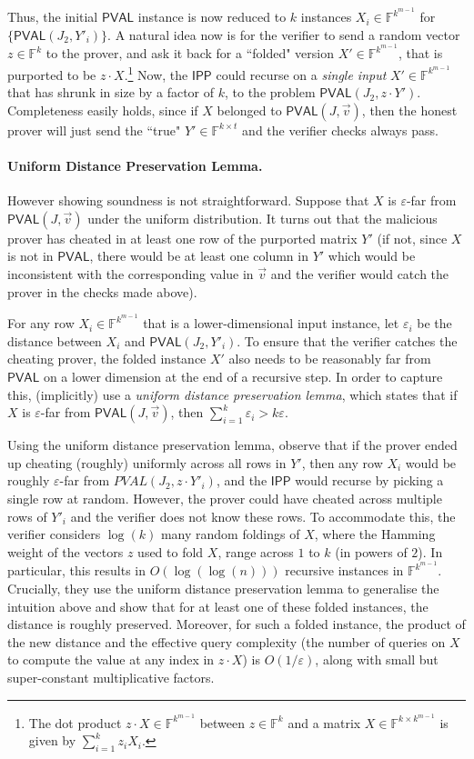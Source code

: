 \documentclass[11pt]{article}
\newcommand{\PVAL}{\mathsf{PVAL}}
\newcommand{\IPP}{\mathsf{IPP}}
\newcommand{\F}{\mathbb{F}}
\begin{document}
Thus, the initial $\PVAL$ instance is now reduced to $k$ instances $X_i \in \F^{k^{m-1}}$ for $\{\PVAL(J_2,Y'_i)\}$. A natural idea now is for the verifier to send a random vector $z \in \F^k$ to the prover, and ask it back for a ``folded" version $X' \in \F^{k^{m-1}}$, that is purported to be $z \cdot X$.\footnote{The dot product $z \cdot X \in \F^{k^{m-1}}$ between $z \in \F^{k}$ and a matrix $X \in \F^{k \times k^{m-1}}$ is given by $\sum_{i=1}^k z_i X_i$.} Now, the $\IPP$ could recurse on a \textit{single input} $X' \in \F^{k^{m-1}}$ that has shrunk in size by a factor of $k$, to the problem $\PVAL(J_2, z \cdot Y')$. Completeness easily holds, since if $X$ belonged to $\PVAL(J,\Vec{v})$, then the honest prover will just send the ``true" $Y' \in \F^{k \times t}$ and the verifier checks always pass. 

\paragraph{Uniform Distance Preservation Lemma.} However showing soundness is not straightforward. Suppose that $X$ is $\varepsilon$-far from $\PVAL(J,\Vec{v})$ under the uniform distribution. It turns out that the malicious prover has cheated in at least one row of the purported matrix $Y'$ (if not, since $X$ is not in $\PVAL$, there would be at least one column in $Y'$ which would be inconsistent with the corresponding value in $\vec{v}$ and the verifier would catch the prover in the checks made above). 

For any row $X_i \in \F^{k^{m-1}}$ that is a lower-dimensional input instance, let $\varepsilon_i$ be the distance between $X_i$ and $\PVAL(J_2, Y'_i)$. To ensure that the verifier catches the cheating prover, the folded instance $X'$ also needs to be reasonably far from $\PVAL$ on a lower dimension at the end of a recursive step. In order to capture this, \cite{RVW} (implicitly) use a \textit{uniform distance preservation lemma}, which states that if $X$ is $\varepsilon$-far from $\PVAL(J,\Vec{v})$, then $\sum_{i=1}^k \varepsilon_i > k \varepsilon$. 

Using the uniform distance preservation lemma, \cite{RVW} observe that if the prover ended up cheating (roughly) uniformly across all rows in $Y'$, then any row $X_i$ would be roughly $\varepsilon$-far from $PVAL(J_2, z \cdot Y'_i)$, and the $\IPP$ would recurse by picking a single row at random. However, the prover could have cheated across multiple rows of $Y'_i$ and the verifier does not know these rows. To accommodate this, the verifier considers $\log(k)$ many random foldings of $X$, where the Hamming weight of the vectors $z$ used to fold $X$, range across $1$ to $k$ (in powers of $2$). In particular, this results in $O(\log (\log (n)))$ recursive instances in $\F^{k^{m-1}}$. Crucially, they use the uniform distance preservation lemma to generalise the intuition above and show that for at least one of these folded instances, the distance is roughly preserved. Moreover, for such a folded instance, the product of the new distance and the effective query complexity (the number of queries on $X$ to compute the value at any index in $z \cdot X$) is $O(1/\varepsilon)$, along with small but super-constant multiplicative factors.
\end{document}

